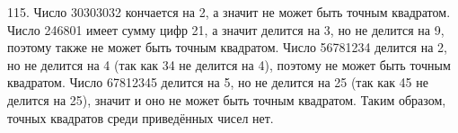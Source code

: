 115. Число 30303032 кончается на 2, а значит не может быть точным квадратом. Число 246801 имеет сумму цифр 21, а значит делится на 3, но не делится на 9, поэтому также не может быть точным квадратом. Число 56781234 делится на 2, но не делится на 4 (так как 34 не делится на 4), поэтому не может быть точным квадратом. Число 67812345 делится на 5, но не делится на 25 (так как 45 не делится на 25), значит и оно не может быть точным квадратом. Таким образом, точных квадратов среди приведённых чисел нет.\\
